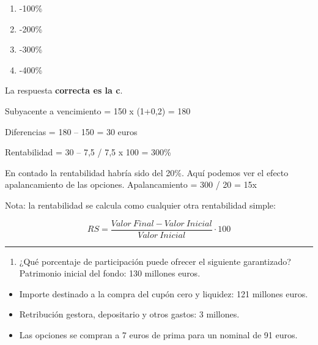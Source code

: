 \documentclass[
  letterpaper,
  DIV=11,
  numbers=noendperiod]{scrreprt}
\providecommand{\tightlist}{%
  \setlength{\itemsep}{0pt}\setlength{\parskip}{0pt}}\usepackage{longtable,booktabs,array}
\begin{document}
\begin{enumerate}
\def\labelenumi{\alph{enumi})}
\item
  -100\%
\item
  -200\%
\item
  -300\%
\item
  -400\%
\end{enumerate}

\begin{tcolorbox}[enhanced jigsaw, left=2mm, opacityback=0, colback=white, breakable, arc=.35mm, bottomrule=.15mm, rightrule=.15mm, toprule=.15mm, leftrule=.75mm, colframe=quarto-callout-tip-color-frame]
\begin{minipage}[t]{5.5mm}
\textcolor{quarto-callout-tip-color}{\faLightbulb}
\end{minipage}%
\begin{minipage}[t]{\textwidth - 5.5mm}

La respuesta \textbf{correcta es la c}.

Subyacente a vencimiento = 150 x (1+0,2) = 180

Diferencias = 180 -- 150 = 30 euros

Rentabilidad = 30 -- 7,5 / 7,5 x 100 = 300\%

En contado la rentabilidad habría sido del 20\%. Aquí podemos ver el
efecto apalancamiento de las opciones. Apalancamiento = 300 / 20 = 15x

Nota: la rentabilidad se calcula como cualquier otra rentabilidad
simple:

\[RS=\frac{Valor\ Final-Valor\ Inicial}{Valor\ Inicial}\cdot100\]

\end{minipage}%
\end{tcolorbox}

\begin{center}\rule{0.5\linewidth}{0.5pt}\end{center}

\begin{enumerate}
\def\labelenumi{\arabic{enumi}.}
\setcounter{enumi}{56}
\tightlist
\item
  ¿Qué porcentaje de participación puede ofrecer el siguiente
  garantizado? Patrimonio inicial del fondo: 130 millones euros.
\end{enumerate}

\begin{itemize}
\item
  Importe destinado a la compra del cupón cero y liquidez: 121 millones
  euros.
\item
  Retribución gestora, depositario y otros gastos: 3 millones.
\item
  Las opciones se compran a 7 euros de prima para un nominal de 91
  euros.
\end{itemize}
\end{document}
